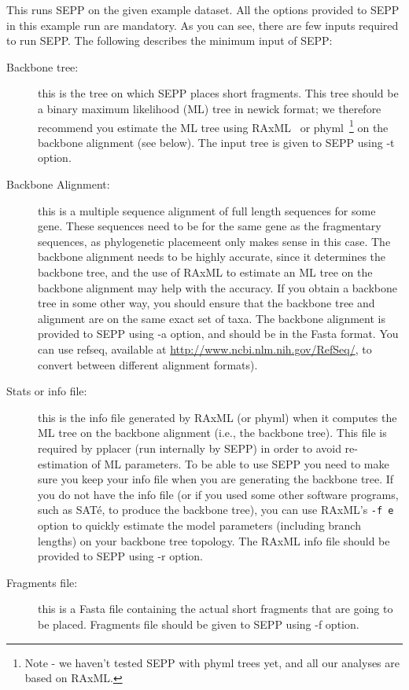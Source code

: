 \documentclass[11pt]{article} %
\newcommand{\sepp}{SEPP\xspace}
\newcommand{\ins}[1]{{\tt #1}}
\newcommand{\sate}{SAT\'{e}\xspace}
\newcommand{\raxml}{RAxML\xspace}
\begin{document}
This runs \sepp on the given example dataset. All the options provided to \sepp in this example run are mandatory. As you can see, there are few inputs required to run \sepp. The following describes the minimum input of \sepp:
\begin {description}
\item[Backbone tree:] this is the tree on which \sepp places short fragments. 
This tree should be a binary maximum likelihood (ML) tree
in newick format; we therefore recommend you estimate
the ML tree  using \raxml~\cite{raxml} or phyml~\cite{phyml}\footnote{Note - we 
haven't tested \sepp with phyml trees yet, and all our analyses are
based on RAxML.}  on the backbone alignment (see below). The 
input tree is given to \sepp using -t option.
\item[Backbone Alignment:] this is a multiple sequence alignment 
of full length sequences for some gene. These sequences need to
be for the same gene as the fragmentary sequences, as phylogenetic
placemeent only makes sense in this case.  The backbone 
alignment needs to be highly accurate, since it determines the backbone
tree, and the use of RAxML to estimate an ML tree on the
backbone alignment may help with the accuracy.  If you obtain a
backbone tree in some other way, you should ensure that the
backbone tree and alignment  are on the same exact set of taxa.
The backbone alignment is provided to \sepp using -a option, and should be in 
the Fasta format. You can use  refseq, available  at 
\url{http://www.ncbi.nlm.nih.gov/RefSeq/}, to convert  between different alignment formats). 
\item[Stats or info file:] this is the info file generated by RAxML (or phyml) 
when it computes the ML tree on the backbone alignment (i.e., the
backbone tree). 
This file is required by  pplacer (run internally by \sepp) 
in order to avoid re-estimation of ML parameters. 
To be able to use \sepp you need to make sure you keep your 
info file when you are generating the backbone tree. 
If you do not have the info file (or if you used 
some other software programs, such as \sate, to produce the
backbone tree), you can use RAxML's \ins{-f e} option to quickly 
estimate the model parameters (including branch lengths) on your 
backbone tree topology. 
The RAxML info file should be provided to \sepp using -r option. 
\item[Fragments file:] this is a Fasta file containing the actual short fragments that are going to be placed. Fragments file should be given to \sepp using -f option. 
\end{description}
\end{document}

